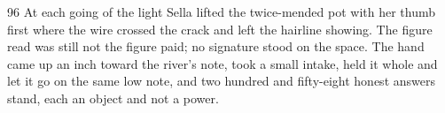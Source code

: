 \begin{CRchronicle}{96}
At each going of the light Sella lifted the twice-mended pot with her thumb first where the wire crossed the crack and left the hairline showing. The figure read was still not the figure paid; no signature stood on the space. The hand came up an inch toward the river’s note, took a small intake, held it whole and let it go on the same low note, and two hundred and fifty-eight honest answers stand, each an object and not a power.
\end{CRchronicle}
